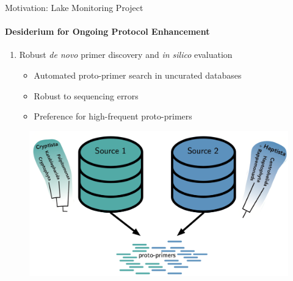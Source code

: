 \documentclass[xcolor=dvipsnames,envcountsect]{beamer}
\begin{document}
\begin{frame}{Motivation: Lake Monitoring Project}
\framesubtitle{Desiderium for Ongoing Protocol Enhancement}
\begin{enumerate}[I]
    \item Robust {\it de novo} primer discovery and {\it in silico} evaluation %
    \begin{itemize}
        \item Automated proto-primer search in uncurated databases 
        \item Robust to sequencing errors
        \item Preference for high-frequent proto-primers 
    \end{itemize}
\end{enumerate}
\begin{figure}
    \includegraphics[scale=.4]{DB_protoprimers}
\end{figure}
\end{frame}
\end{document}
